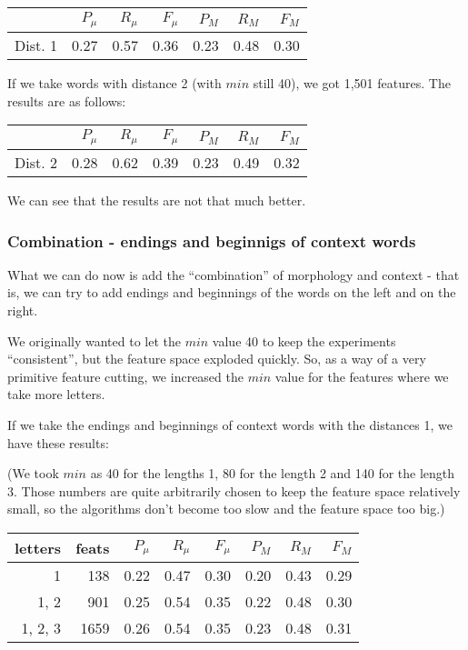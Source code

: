 \documentclass[letterpaper]{article}
\begin{document}
\begin{table}[h]

\begin{tabular}{|r|r|r|r|r|r|r|}
 \hline
 & $P_\mu$ & $R_\mu$ & $F_\mu$ & $P_M$ & $R_M$  & $F_M$ \\ \hline
Dist. 1 & 0.27 & 0.57 & 0.36 & 0.23 & 0.48 & 0.30 \\ \hline
\end{tabular}
\end{table}


If we take words with distance 2 (with $min$ still 40), we got 1,501 features. The results are as follows:

\begin{table}[h]
\begin{tabular}{|r|r|r|r|r|r|r|}
 \hline
 & $P_\mu$ & $R_\mu$ & $F_\mu$ & $P_M$ & $R_M$  & $F_M$ \\ \hline
Dist. 2 & 0.28 & 0.62 & 0.39 & 0.23 & 0.49 & 0.32 \\ \hline
\end{tabular}
\end{table}

We can see that the results are not that much better.

\subsubsection{Combination - endings and beginnigs of context words}
What we can do now is add the ``combination'' of morphology and context - that is, 
we can try to add endings and beginnings of the words on the left and on the right.

We originally wanted to let the $min$ value 40 to keep the experiments ``consistent'',
but the feature space exploded quickly. So, as a way of a very primitive feature cutting,
we increased the $min$ value for the features where we take more letters.

If we take the endings and beginnings of context words with the distances 1, we have these results:

(We took $min$ as 40 for the lengths 1, 80 for the length 2 and 140 for the length 3. 
Those numbers are quite arbitrarily chosen to keep the feature space relatively small, 
so the algorithms don't become too slow and the feature space too big.)

\begin{table}[h]


\begin{tabular}{|r|r|r|r|r|r|r|r|}
\hline
letters&feats & $P_\mu$ & $R_\mu$ & $F_\mu$ & $P_M$ & $R_M$  & $F_M$ \\ \hline
1 & 138 & 0.22 & 0.47 & 0.30 & 0.20 & 0.43 & 0.29 \\ \hline
1, 2  & 901 & 0.25 & 0.54 & 0.35 & 0.22 & 0.48 & 0.30 \\ \hline
1, 2, 3  & 1659 & 0.26 & 0.54 & 0.35 & 0.23 & 0.48 & 0.31 \\ \hline

\end{tabular}
\end{table}
\end{document}
